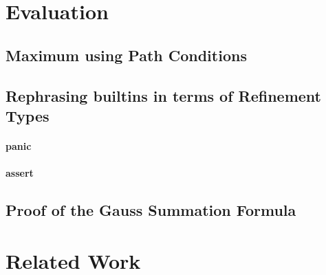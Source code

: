 \documentclass{article}
\theoremstyle{definition}
\begin{document}
\section{Evaluation}

\subsection{Maximum using Path Conditions}



\subsection{Rephrasing builtins in terms of Refinement Types}

\paragraph*{panic}
\paragraph*{assert}

\subsection{Proof of the Gauss Summation Formula}

\section{Related Work}
\end{document}
